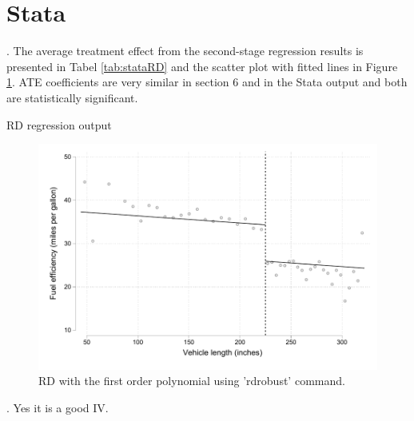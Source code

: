 \documentclass{article}
\begin{document}
\section{Stata}

. The average treatment effect from the second-stage regression results is presented in Tabel \ref{tab:stataRD} and the scatter plot with fitted lines in Figure \ref{fig:StataScatter}. ATE coefficients are very similar in section 6 and in the Stata output and both are statistically significant. 

\begin{table}[h]
    \centering
    
    \caption{RD regression output}
    \label{tab:stataRD}
\end{table}



\begin{figure}[h!]
    \centering
    \includegraphics{homework 7/output/figure/ScatterRD.pdf}
    \caption{RD with the first order polynomial using 'rdrobust' command.}
    \label{fig:StataScatter}
\end{figure}


. Yes it is a good IV. 
\end{document}
